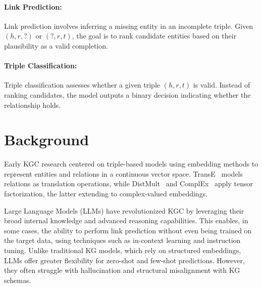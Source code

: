 \documentclass[12pt,a4paper]{article}
\begin{document}
\paragraph{Link Prediction:}
Link prediction involves inferring a missing entity in an incomplete triple. Given \( (h, r, ?) \) or \( (?, r, t) \), the goal is to rank candidate entities based on their plausibility as a valid completion.

\paragraph{Triple Classification:}
Triple classification assesses whether a given triple \( (h, r, t) \) is valid. Instead of ranking candidates, the model outputs a binary decision indicating whether the relationship holds.

%
%


\section{Background}\label{sec:background}

Early KGC research centered on triple-based models using embedding methods to represent entities and relations in a continuous vector space.
TransE~\cite{bordes2013translating} models relations as translation operations, while DistMult~\cite{yang2014embedding} and ComplEx~\cite{trouillon2016complex} apply tensor factorization, the latter extending to complex-valued embeddings.



Large Language Models (LLMs) have revolutionized KGC by leveraging their broad internal knowledge and advanced reasoning capabilities.
This enables, in some cases, the ability to perform link prediction without even being trained on the target data, using techniques such as in-context learning and instruction tuning.
Unlike traditional KG models, which rely on structured embeddings, LLMs offer greater flexibility for zero-shot and few-shot predictions.
However, they often struggle with hallucination and structural misalignment with KG schemas.
\end{document}
